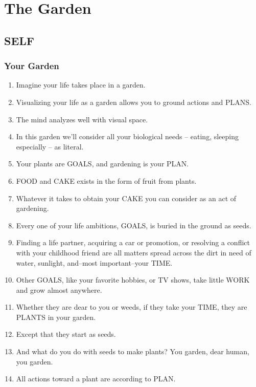 \documentclass[
]{book}
\begin{document}
\hypertarget{part-the-garden}{%
\part{The Garden}\label{part-the-garden}}

\hypertarget{self}{%
\chapter{SELF}\label{self}}

\hypertarget{your-garden}{%
\section{Your Garden}\label{your-garden}}

\begin{enumerate}
\def\labelenumi{\arabic{enumi}.}
\item
  Imagine your life takes place in a garden.
\item
  Visualizing your life as a garden allows you to ground actions and PLANS.
\item
  The mind analyzes well with visual space.
\item
  In this garden we'll consider all your biological needs -- eating, sleeping especially -- as literal.
\item
  Your plants are GOALS, and gardening is your PLAN.
\item
  FOOD and CAKE exists in the form of fruit from plants.
\item
  Whatever it takes to obtain your CAKE you can consider as an act of gardening.
\item
  Every one of your life ambitions, GOALS, is buried in the ground as seeds.
\item
  Finding a life partner, acquiring a car or promotion, or resolving a conflict with
  your childhood friend are all matters spread across the dirt in need of water,
  sunlight, and--most important--your TIME.
\item
  Other GOALS, like your favorite hobbies, or TV shows, take little WORK and
  grow almost anywhere.
\item
  Whether they are dear to you or weeds, if they take your TIME, they are PLANTS
  in your garden.
\item
  Except that they start as seeds.
\item
  And what do you do with seeds to make plants? You garden, dear human, you
  garden.
\item
  All actions toward a plant are according to PLAN.

\end{enumerate}
\end{document}
